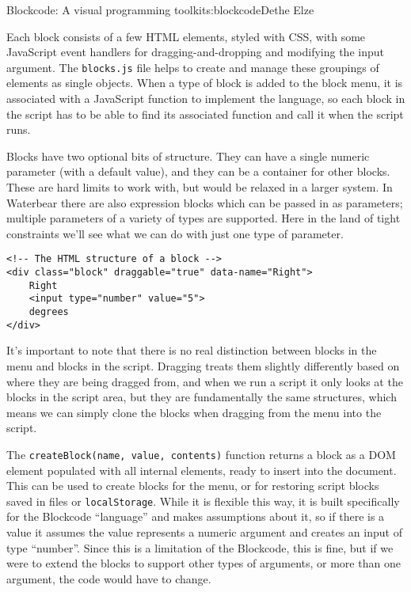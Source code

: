 \begin{aosachapter}{Blockcode: A visual programming toolkit}{s:blockcode}{Dethe Elze}
\label{blocks.js}

Each block consists of a few HTML elements, styled with CSS, with some
JavaScript event handlers for dragging-and-dropping and modifying the
input argument. The \texttt{blocks.js} file helps to create and manage
these groupings of elements as single objects. When a type of block is
added to the block menu, it is associated with a JavaScript function to
implement the language, so each block in the script has to be able to
find its associated function and call it when the script runs.


Blocks have two optional bits of structure. They can have a single
numeric parameter (with a default value), and they can be a container
for other blocks. These are hard limits to work with, but would be
relaxed in a larger system. In Waterbear there are also expression
blocks which can be passed in as parameters; multiple parameters of a
variety of types are supported. Here in the land of tight constraints
we'll see what we can do with just one type of parameter.

\begin{verbatim}
<!-- The HTML structure of a block -->
<div class="block" draggable="true" data-name="Right">
    Right
    <input type="number" value="5">
    degrees
</div>
\end{verbatim}

It's important to note that there is no real distinction between blocks
in the menu and blocks in the script. Dragging treats them slightly
differently based on where they are being dragged from, and when we run
a script it only looks at the blocks in the script area, but they are
fundamentally the same structures, which means we can simply clone the
blocks when dragging from the menu into the script.

The \texttt{createBlock(name, value, contents)} function returns a block
as a DOM element populated with all internal elements, ready to insert
into the document. This can be used to create blocks for the menu, or
for restoring script blocks saved in files or \texttt{localStorage}.
While it is flexible this way, it is built specifically for the
Blockcode ``language'' and makes assumptions about it, so if there is a
value it assumes the value represents a numeric argument and creates an
input of type ``number''. Since this is a limitation of the Blockcode,
this is fine, but if we were to extend the blocks to support other types
of arguments, or more than one argument, the code would have to change.


\end{aosachapter}
